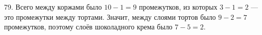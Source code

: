 79. Всего между коржами было $10-1=9$ промежутков, из которых $3-1=2$ --- это промежутки между тортами. Значит, между слоями тортов было $9-2=7$ промежутков, поэтому слоёв шоколадного крема было $7-5=2.$\\
